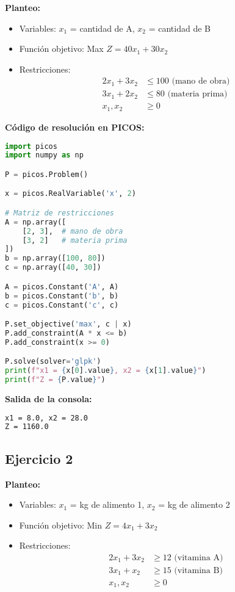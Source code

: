 \documentclass[12pt]{article}
\begin{document}
\textbf{Planteo:}
\begin{itemize}
\item Variables: $x_1$ = cantidad de A, $x_2$ = cantidad de B
\item Función objetivo: Max $Z = 40x_1 + 30x_2$
\item Restricciones:
  \begin{align*}
  2x_1 + 3x_2 &\leq 100 \text{ (mano de obra)} \\
  3x_1 + 2x_2 &\leq 80 \text{ (materia prima)} \\
  x_1, x_2 &\geq 0
  \end{align*}
\end{itemize}

\textbf{Código de resolución en PICOS:}
\begin{lstlisting}[language=Python]
import picos
import numpy as np

P = picos.Problem()

x = picos.RealVariable('x', 2)

# Matriz de restricciones
A = np.array([
    [2, 3],  # mano de obra
    [3, 2]   # materia prima
])
b = np.array([100, 80])
c = np.array([40, 30])

A = picos.Constant('A', A)
b = picos.Constant('b', b)
c = picos.Constant('c', c)

P.set_objective('max', c | x)
P.add_constraint(A * x <= b)
P.add_constraint(x >= 0)

P.solve(solver='glpk')
print(f"x1 = {x[0].value}, x2 = {x[1].value}")
print(f"Z = {P.value}")
\end{lstlisting}

\textbf{Salida de la consola:}
\begin{lstlisting}[language=bash,backgroundcolor=\color{black},basicstyle=\color{white}\ttfamily,numbers=none]
x1 = 8.0, x2 = 28.0
Z = 1160.0
\end{lstlisting}

\subsection{Ejercicio 2}

\textbf{Planteo:}
\begin{itemize}
\item Variables: $x_1$ = kg de alimento 1, $x_2$ = kg de alimento 2
\item Función objetivo: Min $Z = 4x_1 + 3x_2$
\item Restricciones:
  \begin{align*}
  2x_1 + 3x_2 &\geq 12 \text{ (vitamina A)} \\
  3x_1 + x_2 &\geq 15 \text{ (vitamina B)} \\
  x_1, x_2 &\geq 0
  \end{align*}
\end{itemize}
\end{document}
